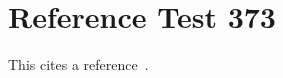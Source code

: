 \documentclass{article}
\begin{document}
\section{Reference Test 373}
This cites a reference~\cite{test373}.

\end{document}
